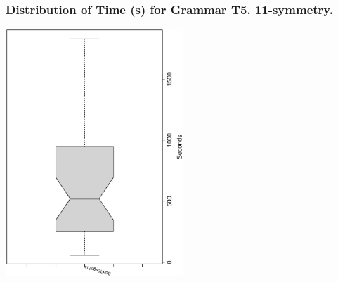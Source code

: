  \begin{frame}
 \frametitle{ Distribution of Time (s) for Grammar T5. 11-symmetry. }
 \begin{center}
\includegraphics[width=0.5\textwidth, angle=-90]
{ExpFboxplottSeconds009.eps}
 \end{center}
 \label{ExpFboxplottSeconds009.eps}  
 \end{frame}

